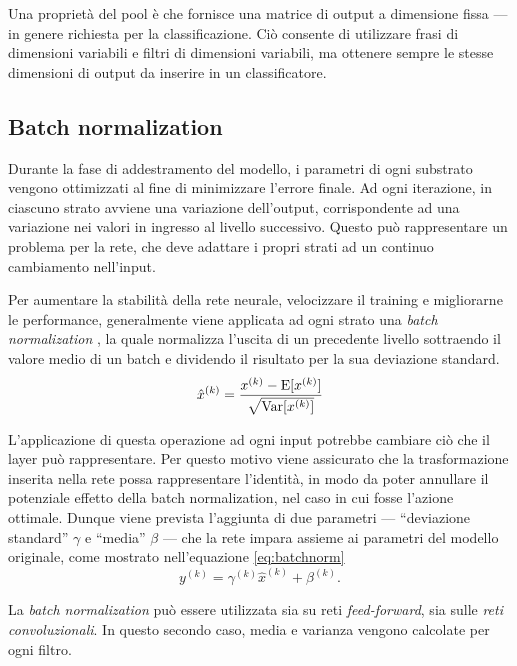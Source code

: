 Una proprietà del pool è che fornisce una matrice di output a dimensione fissa --- in genere richiesta per la classificazione. Ciò consente di utilizzare frasi di dimensioni variabili e filtri di dimensioni variabili, ma ottenere sempre le stesse dimensioni di output da inserire in un classificatore.

\subsection{Batch normalization}
\label{subsec:normalization}

Durante la fase di addestramento del modello, i parametri di ogni substrato vengono ottimizzati al fine di minimizzare l'errore finale.
Ad ogni iterazione, in ciascuno strato avviene una variazione dell'output, corrispondente ad una variazione nei valori in ingresso al livello successivo.
Questo può rappresentare un problema per la rete, che deve adattare i propri strati ad un continuo cambiamento nell'input. 

Per aumentare la stabilità della rete neurale, velocizzare il training e migliorarne le performance, generalmente viene applicata ad ogni strato una \emph{batch normalization}  \cite{ioffe2015batch}, la quale normalizza l'uscita di un precedente livello sottraendo il valore medio di un batch e dividendo il risultato per la sua deviazione standard.
\begin{equation}
	\hat{x}^{(k)}=\frac{x^{(k)}-\operatorname{E}[x^{(k)}]}{\sqrt{\operatorname{Var}[x^{(k)}]}}
\end{equation}

L'applicazione di questa operazione ad ogni input potrebbe cambiare ciò che il layer può rappresentare. Per questo motivo viene assicurato che la trasformazione inserita nella rete possa rappresentare l'identità, in modo da poter annullare il potenziale effetto della batch normalization, nel caso in cui fosse l'azione ottimale.
Dunque viene prevista l'aggiunta di due parametri --- ``deviazione standard'' $\gamma$ e ``media'' $\beta$ --- che la rete impara assieme ai parametri del modello originale, come mostrato nell'equazione \ref{eq:batchnorm}
\begin{equation}
	y^{(k)}=\gamma^{(k)}\hat{x}^{(k)}+\beta^{(k)}\mbox{.}
	\label{eq:batchnorm}
\end{equation}

La \emph{batch normalization} può essere utilizzata sia su reti \emph{feed-forward}, sia sulle \emph{reti convoluzionali}.
In questo secondo caso, media e varianza vengono calcolate per ogni filtro.

